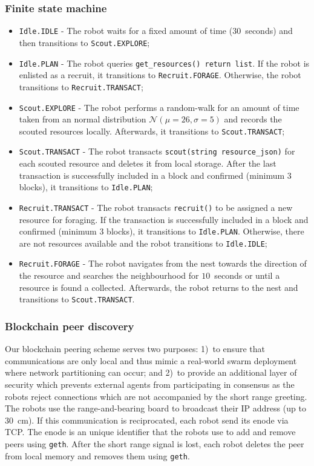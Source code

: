 \documentclass[runningheads]{llncs}
\newcommand{\rab}{range-and-bearing\xspace}
\begin{document}
\subsubsection{Finite state machine}
\label{sec:finite-state-machine}
\begin{itemize}
\item \texttt{Idle.IDLE} - The robot waits for a fixed amount of time ($30$~seconds) and then transitions to \texttt{Scout.EXPLORE};
\item \texttt{Idle.PLAN} - The robot queries \texttt{get\_resources() return list}. If the robot is enlisted as a recruit, it transitions to \texttt{Recruit.FORAGE}. Otherwise, the robot transitions to \texttt{Recruit.TRANSACT};
\item \texttt{Scout.EXPLORE} - The robot performs a random-walk for an amount of time taken from an normal distribution $\mathcal{N}(\mu=26,\sigma=5)$ and records the scouted resources locally. Afterwards, it transitions to \texttt{Scout.TRANSACT};
\item \texttt{Scout.TRANSACT} - The robot transacts \texttt{scout(string resource\_json)} for each scouted resource and deletes it from local storage. After the last transaction is successfully included in a block and confirmed (minimum 3 blocks), it transitions to \texttt{Idle.PLAN};
\item \texttt{Recruit.TRANSACT} - The robot transacts \texttt{recruit()} to be assigned a new resource for foraging. If the transaction is successfully included in a block and confirmed (minimum 3 blocks), it transitions to \texttt{Idle.PLAN}. Otherwise, there are not resources available and the robot transitions to \texttt{Idle.IDLE};
\item \texttt{Recruit.FORAGE} - The robot navigates from the nest towards the direction of the resource and searches the neighbourhood for $10$~seconds or until a resource is found a collected. Afterwards, the robot returns to the nest and transitions to \texttt{Scout.TRANSACT}.
\end{itemize}

\subsubsection{Blockchain peer discovery}
\label{sec:peer-discovery}
Our blockchain peering scheme serves two purposes: 1)~to ensure that communications are only local and thus mimic a real-world swarm deployment where network partitioning can occur; and 2)~to provide an additional layer of security which prevents external agents from participating in consensus as the robots reject connections which are not accompanied by the short range greeting.
The robots use the \rab board to broadcast their IP address (up to $30$~cm). If this communication is reciprocated, each robot send its enode via TCP. The enode is an unique identifier that the robots use to add and remove peers using \texttt{geth}. After the short range signal is lost, each robot deletes the peer from local memory and removes them using \texttt{geth}. 
\end{document}
